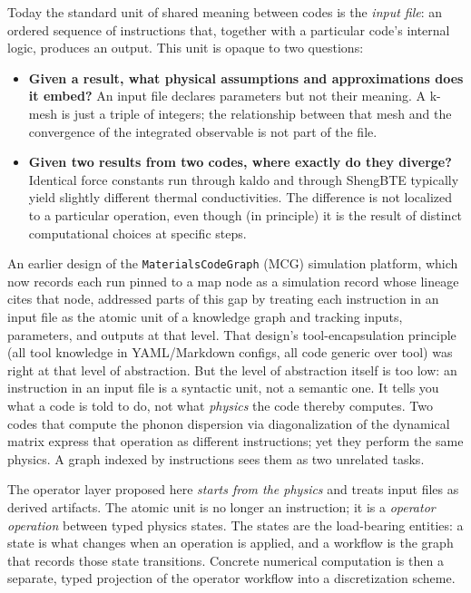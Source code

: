 \documentclass[11pt,a4paper]{article}
\begin{document}
Today the standard unit of shared meaning between codes is the \emph{input file}: an ordered
sequence of instructions that, together with a particular code's internal logic, produces an
output. This unit is opaque to two questions:

\begin{itemize}[leftmargin=2em]
  \item \textbf{Given a result, what physical assumptions and approximations does it embed?}
        An input file declares parameters but not their meaning. A k-mesh is just a triple of
        integers; the relationship between that mesh and the convergence of the integrated
        observable is not part of the file.
  \item \textbf{Given two results from two codes, where exactly do they diverge?} Identical force
        constants run through kaldo and through ShengBTE typically yield slightly different
        thermal conductivities. The difference is not localized to a particular operation, even
        though (in principle) it is the result of distinct computational choices at specific
        steps.
\end{itemize}

An earlier design of the \texttt{MaterialsCodeGraph} (MCG) simulation platform, which now
records each run pinned to a map node as a simulation record whose lineage cites that node,
addressed parts of this gap by treating each instruction in an input file as the atomic unit of
a knowledge graph and tracking inputs, parameters, and outputs at that level. That design's
tool-encapsulation principle (all tool knowledge in YAML/Markdown configs, all code generic over
tool) was right at that level of abstraction. But the level of abstraction itself is too low: an
instruction in an input file is a syntactic unit, not a semantic one. It tells you what a code
is told to do, not what \emph{physics} the code thereby computes. Two codes that compute the
phonon dispersion via diagonalization of the dynamical matrix express that operation as
different instructions; yet they perform the same physics. A graph indexed by instructions sees
them as two unrelated tasks.

\medskip

The operator layer proposed here \emph{starts from the physics} and treats input files as derived
artifacts. The atomic unit is no longer an instruction; it is a \emph{operator operation} between
typed physics states. The states are the load-bearing entities: a state is what changes when an
operation is applied, and a workflow is the graph that records those state transitions. Concrete
numerical computation is then a separate, typed projection of the operator workflow into a
discretization scheme.
\end{document}

